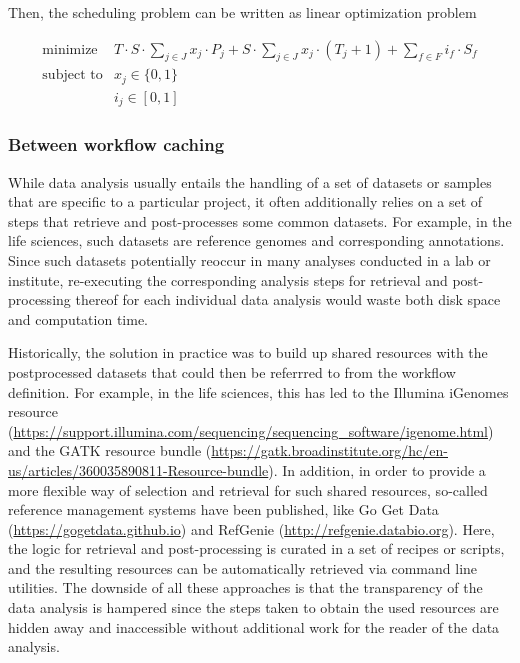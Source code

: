 \documentclass[parskip=half]{scrartcl}
\let\plainurl\url
\renewcommand{\url}[1]{\protect\plainurl{#1}}
\begin{document}
Then, the scheduling problem can be written as linear optimization problem 

\begin{align*}
	\text{minimize} & T \cdot S \cdot \sum_{j \in J} x_j \cdot P_j + S \cdot \sum_{j \in J} x_j \cdot (T_j+1) + \sum_{f \in F} i_f \cdot S_f \\ \text{subject to} & x_j \in \{0,1\}\\ \quad & i_j \in [0,1]
\end{align*}

\subsubsection{Between workflow caching} 

While data analysis usually entails the handling of a set of datasets or samples that are specific to a particular project, it often additionally relies on a set of steps that retrieve and post-processes some common datasets.
For example, in the life sciences, such datasets are reference genomes and corresponding annotations.
Since such datasets potentially reoccur in many analyses conducted in a lab or institute, re-executing the corresponding analysis steps for retrieval and post-processing thereof for each individual data analysis would waste both disk space and computation time.

Historically, the solution in practice was to build up shared resources with the postprocessed datasets that could then be referrred to from the workflow definition.
For example, in the life sciences, this has led to the Illumina iGenomes resource (\url{https://support.illumina.com/sequencing/sequencing\_software/igenome.html}) and the GATK resource bundle (\url{https://gatk.broadinstitute.org/hc/en-us/articles/360035890811-Resource-bundle}).
In addition, in order to provide a more flexible way of selection and retrieval for such shared resources, so-called reference management systems have been published, like Go Get Data (\url{https://gogetdata.github.io}) and RefGenie (\url{http://refgenie.databio.org}).
Here, the logic for retrieval and post-processing is curated in a set of recipes or scripts, and the resulting resources can be automatically retrieved via command line utilities.
The downside of all these approaches is that the transparency of the data analysis is hampered since the steps taken to obtain the used resources are hidden away and inaccessible without additional work for the reader of the data analysis.
\end{document}
